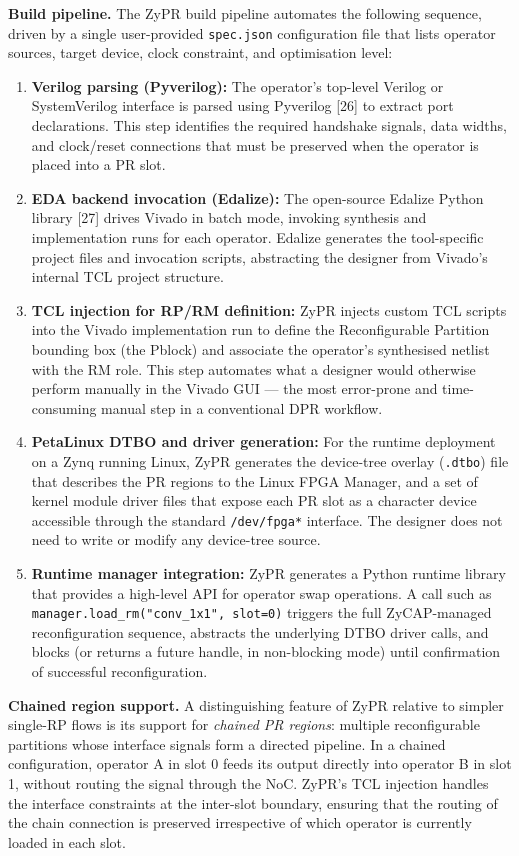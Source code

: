 \textbf{Build pipeline.} The ZyPR build pipeline automates the following sequence, driven by a single user-provided \texttt{spec.json} configuration file that lists operator sources, target device, clock constraint, and optimisation level:

\begin{enumerate}
  \item \textbf{Verilog parsing (Pyverilog):} The operator's top-level Verilog or SystemVerilog interface is parsed using Pyverilog [26] to extract port declarations. This step identifies the required handshake signals, data widths, and clock/reset connections that must be preserved when the operator is placed into a PR slot.
  \item \textbf{EDA backend invocation (Edalize):} The open-source Edalize Python library [27] drives Vivado in batch mode, invoking synthesis and implementation runs for each operator. Edalize generates the tool-specific project files and invocation scripts, abstracting the designer from Vivado's internal TCL project structure.
  \item \textbf{TCL injection for RP/RM definition:} ZyPR injects custom TCL scripts into the Vivado implementation run to define the Reconfigurable Partition bounding box (the Pblock) and associate the operator's synthesised netlist with the RM role. This step automates what a designer would otherwise perform manually in the Vivado GUI — the most error-prone and time-consuming manual step in a conventional DPR workflow.
  \item \textbf{PetaLinux DTBO and driver generation:} For the runtime deployment on a Zynq running Linux, ZyPR generates the device-tree overlay (\texttt{.dtbo}) file that describes the PR regions to the Linux FPGA Manager, and a set of kernel module driver files that expose each PR slot as a character device accessible through the standard \texttt{/dev/fpga*} interface. The designer does not need to write or modify any device-tree source.
  \item \textbf{Runtime manager integration:} ZyPR generates a Python runtime library that provides a high-level API for operator swap operations. A call such as \texttt{manager.load\_rm("conv\_1x1", slot=0)} triggers the full ZyCAP-managed reconfiguration sequence, abstracts the underlying DTBO driver calls, and blocks (or returns a future handle, in non-blocking mode) until confirmation of successful reconfiguration.
\end{enumerate}
\textbf{Chained region support.} A distinguishing feature of ZyPR relative to simpler single-RP flows is its support for \textit{chained PR regions}: multiple reconfigurable partitions whose interface signals form a directed pipeline. In a chained configuration, operator A in slot 0 feeds its output directly into operator B in slot 1, without routing the signal through the NoC. ZyPR's TCL injection handles the interface constraints at the inter-slot boundary, ensuring that the routing of the chain connection is preserved irrespective of which operator is currently loaded in each slot.

